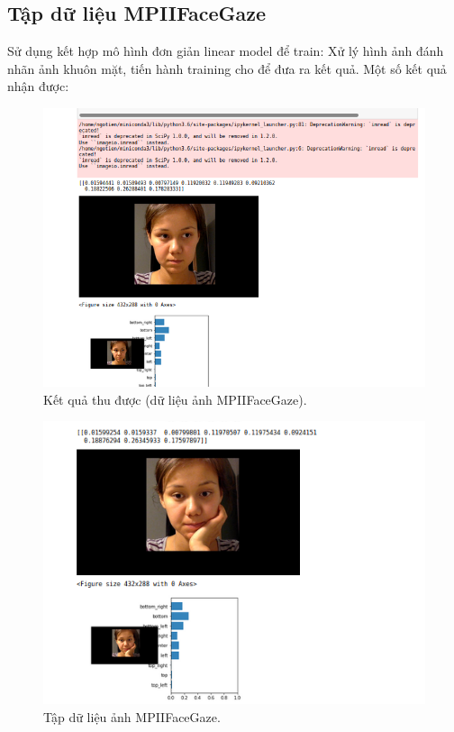 \newpage
\subsection{Tập dữ liệu MPIIFaceGaze}

Sử dụng kết hợp mô hình đơn giản linear model để train: Xử lý hình ảnh đánh nhãn ảnh khuôn mặt, tiến hành training cho để đưa ra kết quả. Một số kết quả nhận được:
 \begin{center}
    \begin{figure}[h!]
    \begin{center}
     \includegraphics[scale=0.6]{img/MPIIFaceGaze-anh-dau-co-ten-file.png}
    \end{center}
    \caption{Kết quả thu được (dữ liệu ảnh MPIIFaceGaze).}
    \label{refhinh20}
    \end{figure}
\end{center}

 \begin{center}
    \begin{figure}[h!]
    \begin{center}
     \includegraphics[scale=0.75]{img/MPIIFaceGaze-anh-ket-qua1.png}
    \end{center}
    \caption{Tập dữ liệu ảnh MPIIFaceGaze.}
    \label{refhinh20}
    \end{figure}
\end{center}
\clearpage 

